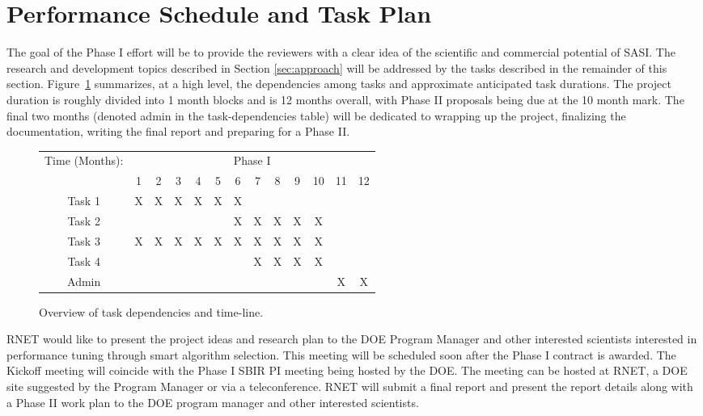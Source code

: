 \section{Performance Schedule and Task Plan}
\label{sec:taskplan}

The goal of the Phase I effort will be to provide the reviewers with a clear idea 
of the scientific and commercial potential of SASI. The research and development topics 
described in Section \ref{sec:approach} will be addressed by the tasks described in the remainder of this section. 
Figure~\ref{fig:tasks} summarizes, at a high level, the dependencies among tasks 
and approximate anticipated task durations. The project duration is roughly 
divided into 1 month blocks and is 12 months overall, with Phase II proposals being due at the 10 month mark. The final two months (denoted admin in the task-dependencies table) will be dedicated to wrapping up the project, finalizing the documentation, writing the final 
report and preparing for a Phase II. 

\begin{figure}
\centering
\begin{tabular}{|c|c|c|c|c|c|c|c|c|c|c|c|c|}
   \hline 
   \multirow{2}{*}{ Time (Months): } & \multicolumn{12}{|c|}{ Phase I } \\
   \cline{2-13} 
   & 1 & 2 & 3 & 4 & 5 & 6 & 7 &8 & 9 & 10 & 11 & 12 \\
   \hline 
   Task 1 & X & X & X  & X &  X & X & & & & & &  \\
   \hline
   Task 2 & & & & & & X& X & X & X &X & &   \\
  \hline
   Task 3 &X &X &X & X & X & X & X & X & X & X & &\\
  \hline
   Task 4 & & & &  &  &  & X & X & X & X & & \\
  \hline
   Admin & & & &  &  &  &  & & &  & X & X\\
  \hline

\end{tabular}
\caption{Overview of task dependencies and time-line.}
\label{fig:tasks}
\end{figure}


RNET would like to present the project ideas and research plan to the DOE 
Program Manager and other interested scientists interested in performance tuning
through smart algorithm selection. This meeting will 
be scheduled soon after the Phase I contract is awarded. The Kickoff meeting 
will coincide with the Phase I SBIR PI meeting being hosted by the DOE. The 
meeting can be hosted at RNET, a DOE site suggested by the Program Manager or 
via a teleconference. RNET will submit a final report and present the report 
details along with a Phase II work plan to the DOE program manager and other 
interested scientists.

